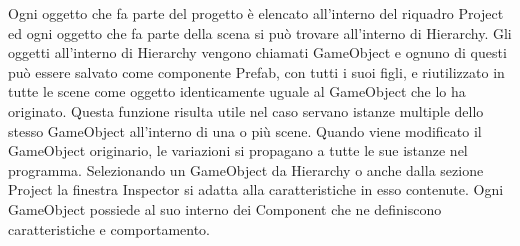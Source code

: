 Ogni oggetto che fa parte del progetto è elencato all’interno del riquadro Project ed ogni oggetto che fa parte della scena si può trovare all’interno di Hierarchy. Gli oggetti all’interno di Hierarchy vengono chiamati GameObject e ognuno di questi può essere salvato come componente Prefab, con tutti i suoi figli, e riutilizzato in tutte le scene come oggetto identicamente uguale al GameObject che lo ha originato. Questa funzione risulta utile nel caso servano istanze multiple dello stesso GameObject all’interno di una o più scene. Quando viene modificato il GameObject originario, le variazioni si propagano a tutte le sue istanze nel programma. Selezionando un GameObject da Hierarchy o anche dalla sezione Project la finestra Inspector si adatta alla caratteristiche in esso contenute. Ogni GameObject possiede al suo interno dei Component che ne definiscono caratteristiche e comportamento.

